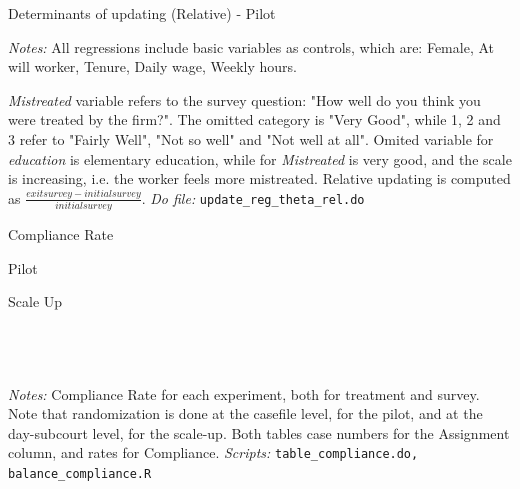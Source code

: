 \documentclass[11pt]{article}
\begin{document}
\begin{landscape}
\begin{table}[H]
\caption{Determinants of updating (Relative) - Pilot}
\label{Table_determinants_updating}
\begin{center}
\scriptsize{}
\end{center}
 \footnotesize
\textit{Notes:} 
All regressions include basic variables as controls, which are: Female, At will worker, Tenure, Daily wage, Weekly hours.

\emph{Mistreated} variable refers to the survey question: "How well do you think you were treated by the firm?". The omitted category is "Very Good", while 1, 2 and 3 refer to "Fairly Well", "Not so well" and "Not well at all".
Omited variable for \emph{education} is elementary education, while for \emph{Mistreated} is very good, and the scale is increasing, i.e. the worker feels more mistreated. Relative updating is computed as $\frac{exitsurvey-initialsurvey}{initialsurvey}$.
\textit{Do file: } \texttt{update\_reg\_theta\_rel.do}
\end{table}
\end{landscape}


\begin{table}[H]
    \caption{Compliance Rate}
    \label{Table_compliance}
    \begin{subtable}{1\textwidth}
      \centering
        \caption{Pilot}
        \scriptsize{}
    \end{subtable}%
    
    \bigskip
    \begin{subtable}{1\textwidth}
      \centering
        \caption{Scale Up}
        \scriptsize{}
    \end{subtable}
           \footnotesize
           \\
           \\
           \\
  \textit{Notes:} 
    Compliance Rate for each experiment, both for treatment and survey. Note that randomization is done at the casefile level, for the pilot, and at the day-subcourt level, for the scale-up. Both tables case numbers for the Assignment column, and rates for Compliance.
    \textit{Scripts: } \texttt{table\_compliance.do, balance\_compliance.R}
\end{table}
\end{document}

